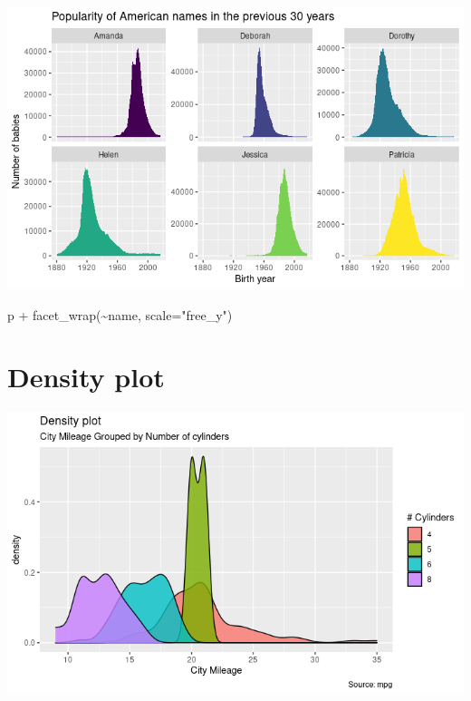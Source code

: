 \documentclass[
]{book}
\newenvironment{Shaded}{\begin{snugshade}}{\end{snugshade}}
\newcommand{\AttributeTok}[1]{\textcolor[rgb]{0.77,0.63,0.00}{#1}}
\newcommand{\FunctionTok}[1]{\textcolor[rgb]{0.00,0.00,0.00}{#1}}
\newcommand{\NormalTok}[1]{#1}
\newcommand{\SpecialCharTok}[1]{\textcolor[rgb]{0.00,0.00,0.00}{#1}}
\newcommand{\StringTok}[1]{\textcolor[rgb]{0.31,0.60,0.02}{#1}}
\begin{document}
\includegraphics{images/10/000006.png}

\begin{Shaded}
\begin{Highlighting}[]
\NormalTok{p }\SpecialCharTok{+} \FunctionTok{facet\_wrap}\NormalTok{(}\SpecialCharTok{\textasciitilde{}}\NormalTok{name, }\AttributeTok{scale=}\StringTok{"free\_y"}\NormalTok{)}
\end{Highlighting}
\end{Shaded}

\hypertarget{density-plot}{%
\section{Density plot}\label{density-plot}}

\includegraphics{images/10/000003.png}
\end{document}
